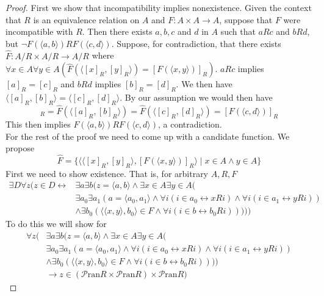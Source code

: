 \documentclass{report}
\begin{document}
\begin{proof}
First we show that incompatibility implies nonexistence. Given the context that $R$ is an equivalence relation on $A$ and $F:A\times A\to A$, suppose that $F$ were incompatible with $R$.
Then there exists $a,b,c$ and $d$ in $A$ such that $aRc$ and $bRd$, but $\neg F(\langle a,b\rangle)RF(\langle c,d\rangle)$. 
Suppose, for contradiction, that there exists $\hat F:A/R\times A/R\to A/R$ where
$\forall x\in A\forall y\in A(\hat F(\langle[x]_R,[y]_R\rangle)=[F(\langle x,y\rangle)]_R)$. $aRc$ implies $[a]_R=[c]_R$ and $bRd$ implies $[b]_R=[d]_R$. We then have
$\langle[a]_R,[b]_R\rangle=\langle[c]_R,[d]_R\rangle$. By our assumption we would then have
\begin{equation*}
[F(\langle a,b\rangle)]_R=\hat F(\langle[a]_R,[b]_R\rangle)=\hat F(\langle[c]_R,[d]_R\rangle)=[F(\langle c,d\rangle)]_R
\end{equation*}
This then implies $F(\langle a,b\rangle)RF(\langle c,d\rangle)$, a contradiction.\\
\indent For the rest of the proof we need to come up with a candidate function. We propose
\begin{equation*}
\hat F=\{\langle\langle[x]_R,[y]_R\rangle,[F(\langle x,y\rangle)]_R\rangle\mid x\in A\land y\in A\}
\end{equation*}
First we need to show existence. That is, for arbitrary $A,R,F$
\begin{align*}
\exists D\forall z(z\in D\leftrightarrow&\exists a\exists b(z=\langle a,b\rangle\land\exists x\in A\exists y\in A(\\&\exists a_0\exists a_1(a=\langle a_0,a_1\rangle\land\forall i(i\in a_0\leftrightarrow xRi)
\land\forall i(i\in a_1\leftrightarrow yRi))\\
&\land\exists b_0(\langle\langle x,y\rangle,b_0\rangle\in F\land\forall i(i\in b\leftrightarrow b_0Ri)))))
\end{align*}
To do this we will show for
\begin{align*}
\forall z(&\exists a\exists b(z=\langle a,b\rangle\land\exists x\in A\exists y\in A(\\&\exists a_0\exists a_1(a=\langle a_0,a_1\rangle\land\forall i(i\in a_0\leftrightarrow xRi)
\land\forall i(i\in a_1\leftrightarrow yRi))\\
&\land\exists b_0(\langle\langle x,y\rangle,b_0\rangle\in F\land\forall i(i\in b\leftrightarrow b_0Ri))))\\
&\to z\in(\mathscr P\text{ran}R\times\mathscr P\text{ran}R)\times\mathscr P\text{ran}R)

\end{align*}
\end{proof}
\end{document}
